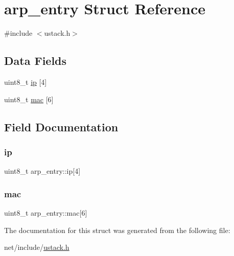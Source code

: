 \hypertarget{structarp__entry}{}\section{arp\+\_\+entry Struct Reference}
\label{structarp__entry}


{\ttfamily \#include $<$ustack.\+h$>$}

\subsection*{Data Fields}
\begin{DoxyCompactItemize}
\item 
uint8\+\_\+t \hyperlink{structarp__entry_a66483dc0b1c1ef9215b1e85185044d54}{ip} \mbox{[}4\mbox{]}
\item 
uint8\+\_\+t \hyperlink{structarp__entry_af9a7c3845ffe5ef927c4d94b65d9cb7e}{mac} \mbox{[}6\mbox{]}
\end{DoxyCompactItemize}


\subsection{Field Documentation}
\mbox{\label{structarp__entry_a66483dc0b1c1ef9215b1e85185044d54}} 
\subsubsection{\texorpdfstring{ip}{ip}}
{\footnotesize\ttfamily uint8\+\_\+t arp\+\_\+entry\+::ip\mbox{[}4\mbox{]}}

\mbox{\label{structarp__entry_af9a7c3845ffe5ef927c4d94b65d9cb7e}} 
\subsubsection{\texorpdfstring{mac}{mac}}
{\footnotesize\ttfamily uint8\+\_\+t arp\+\_\+entry\+::mac\mbox{[}6\mbox{]}}



The documentation for this struct was generated from the following file\+:\begin{DoxyCompactItemize}
\item 
net/include/\hyperlink{ustack_8h}{ustack.\+h}\end{DoxyCompactItemize}
